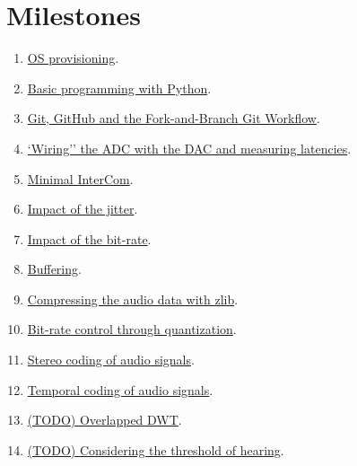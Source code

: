 \section{Milestones}
\begin{enumerate}
\item \href{https://tecnologias-multimedia.github.io/study_guide/01-provisioning/}{OS provisioning}.
\item \href{https://tecnologias-multimedia.github.io/study_guide/02-python/}{Basic programming with Python}.
\item \href{https://tecnologias-multimedia.github.io/study_guide/03-git/}{Git, GitHub and the Fork-and-Branch Git Workflow}.
\item \href{https://tecnologias-multimedia.github.io/study_guide/04-wiring/}{`Wiring'' the ADC with the DAC and measuring latencies}.
\item \href{https://tecnologias-multimedia.github.io/study_guide/05-minimal/}{Minimal InterCom}.
\item \href{https://tecnologias-multimedia.github.io/study_guide/06-jitter_impact/}{Impact of the jitter}.
\item \href{https://tecnologias-multimedia.github.io/study_guide/07-bit-rate_impact/}{Impact of the bit-rate}.
\item \href{https://tecnologias-multimedia.github.io/study_guide/08-buffer/}{Buffering}.
\item \href{https://tecnologias-multimedia.github.io/study_guide/09-compress/}{Compressing the audio data with zlib}.
\item \href{https://tecnologias-multimedia.github.io/study_guide/10-br_control/}{Bit-rate control through quantization}.
\item \href{https://tecnologias-multimedia.github.io/study_guide/11-stereo_coding/}{Stereo coding of audio signals}.
\item \href{https://tecnologias-multimedia.github.io/study_guide/12-temporal_coding/}{Temporal coding of audio signals}.
\item \href{https://tecnologias-multimedia.github.io/study_guide/13-overlapped_temporal_coding/}{(TODO) Overlapped DWT}.
\item \href{https://tecnologias-multimedia.github.io/study_guide/14-threshold_of_hearing/}{(TODO) Considering the threshold of hearing}.
\end{enumerate}
